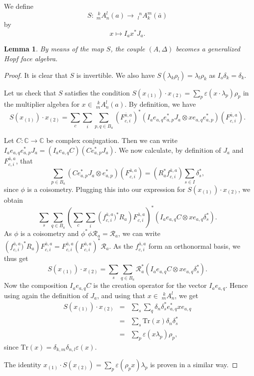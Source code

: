 \documentclass[12pt]{article}
\theoremstyle{change}
\newcommand{\C}{\mathbb{C}}
\newcommand{\Tr}{\mathrm{Tr}}
\newcommand{\Gr}[5]{\;{}^{\;#2}_{#4}#1_{#5}^{#3}}%
\newtheorem{Lem}[Theorem]{Lemma}
\theoremstyle{definition}
\numberwithin{equation}{section}
\begin{document}
We define \[S: \Gr{A}{k}{l}{m}{n}(a)\rightarrow \Gr{A}{n}{m}{l}{k}(\bar{a})\] by \[x \mapsto I_ax^*J_a.\]

\begin{Lem} By means of the map $S$, the couple $(A,\Delta)$ becomes a generalized Hopf face algebra.
\end{Lem}

\begin{proof} It is clear that $S$ is invertible. We also have $S(\lambda_k\rho_l) = \lambda_l\rho_k$ as $I_o\delta_k = \delta_k$.

Let us check that $S$ satisfies the condition $S(x_{(1)})\cdot x_{(2)} = \sum_p \varepsilon(x\cdot \lambda_p)\rho_p$ in the multiplier algebra for $x\in \Gr{A}{k}{l}{m}{n}(a)$. By definition, we have \[S(x_{(1)})\cdot x_{(2)} = \sum_{c}\sum_i\sum_{p,q\in B_a} \left(F_{c,i}^{\bar{a},a}\right)^*\left(I_ae_{a,q}e_{a,p}^*J_a\otimes xe_{a,q}e_{a,p}^*\right)\left(F_{c,i}^{\bar{a},a}\right).\]

Let $C:\C\rightarrow \C$ be complex conjugation. Then we can write $I_ae_{a,q}e_{a,p}^*J_a = (I_ae_{a,q}C)(Ce_{a,p}^*J_a)$. We now calculate, by definition of $J_a$ and $F_{c,i}^{\bar{a},a}$, that \[\sum_{p\in B_a} (Ce_{a,p}^*J_a\otimes e_{a,p}^*)\left(F_{c,i}^{\bar{a},a}\right) =  (R_a^*f_{c,i}^{\bar{a},a})\sum_{s\in I} \delta_s^*,\] since $\phi$ is a coisometry. Plugging this into our expression for $S(x_{(1)})\cdot x_{(2)}$, we obtain \[\sum_s\sum_{q\in B_a}\left(\sum_c\sum_i \left(f_{c,i}^{\bar{a},a})^*R_a\right) F_{c,i}^{\bar{a},a} \right)^* (I_ae_{a,q}C\otimes xe_{a,q}\delta_s^*).\] As $\phi$ is a coisometry and $\phi^*\phi \mathscr{R}_a = \mathscr{R}_a$, we can write $\left(f_{c,i}^{\bar{a},a})^*R_a\right) F_{c,i}^{\bar{a},a} = F_{c,i}^{\bar{a},a}(F_{c,i}^{\bar{a},a})^*\mathscr{R}_a$. As the $f_{c,i}^{\bar{a},a}$ form an orthonormal basis, we thus get \[S(x_{(1)})\cdot x_{(2)} = \sum_s\sum_{q\in B_a} \mathscr{R}_a^*(I_ae_{a,q}C\otimes xe_{a,q}\delta_s^*).\] Now the composition $I_ae_{a,q}C$ is the creation operator for the vector $I_ae_{a,q}$. Hence using again the definition of $J_a$, and using that $x\in \Gr{A}{k}{l}{m}{n}$, we get \begin{eqnarray*} S(x_{(1)})\cdot x_{(2)} &=& \sum_{s}\sum_q \delta_n\delta_s^* e_{a,q}^*xe_{a,q} \\ &=& \sum_s\Tr(x)\delta_n\delta_s^* \\ &=& \sum_p \varepsilon(x\lambda_p)\rho_p,\end{eqnarray*} since $\Tr(x) = \delta_{k,m}\delta_{n,l}\varepsilon(x)$.

The identity $x_{(1)}\cdot S(x_{(2)}) = \sum_p\varepsilon(\rho_px)\lambda_p$ is proven in a similar way.
\end{proof}
\end{document}
